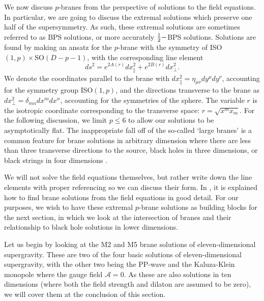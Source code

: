 We now discuss $p$-branes from the perspective of solutions to the field equations. In particular, we are going to discuss the extremal solutions which preserve one half of the supersymmetry. As such, these extremal solutions are sometimes referred to as BPS solutions, or more accurately $\frac{1}{2}-$BPS solutions. Solutions are found by making an ansatz for the $p$-brane with the symmetry of ISO$(1,p) \times \text{SO}(D-p-1)$, with the corresponding line element 
\begin{equation*}
	ds^2 = e^{2A(r)} dx^2_\parallel + e^{2B(r)} dx^2_\perp.
\end{equation*} 
We denote the coordinates parallel to the brane with $dx^2_\parallel = \eta_{\mu \nu} dy^\mu dy^\nu$, accounting for the symmetry group ISO$(1,p)$, and the directions transverse to the brane as $dx^2_{\perp} = \delta_{m n} dx^m dx^n$, accounting for the symmetries of the sphere. The variable $r$ is the isotropic coordinate corresponding to the transverse space: $r = \sqrt{x^m x_m}$. For the following discussion, we limit $p \leq 6$ to allow our solutions to be asymptotically flat. The inappropriate fall off of the so-called `large branes' is a common feature for brane solutions in arbitrary dimension where there are less than three transverse directions to the source, \eg black holes in three dimensions, or black strings in four dimensions \cite{Mohaupt:2000gc}.

We will not solve the field equations themselves, but rather write down the line elements with proper referencing so we can discuss their form. In  \cite{Stelle:1998xg, Duff:1999rk}, it is explained how to find brane solutions from the field equations in good detail. For our purposes, we wish to have these extremal $p$-brane solutions as building blocks for the next section, in which we look at the intersection of branes and their relationship to black hole solutions in lower dimensions. 

Let us begin by looking at the M2 and M5 brane solutions of eleven-dimensional supergravity. These are two of the four basic solutions of eleven-dimensional supergravity, with the other two being the PP-wave and the Kaluza-Klein monopole where the gauge field $\mathcal{A} = 0$. As these are also solutions in ten dimensions (where both the field strength and dilaton are assumed to be zero), we will cover them at the conclusion of this section.

